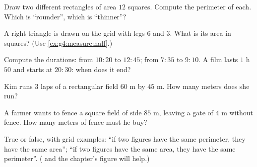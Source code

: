 \begin{exercise}[$\star$]\label{exo:g4:measure:6}
Draw two different rectangles of area $12$ squares. Compute the
perimeter of each. Which is ``rounder'', which is ``thinner''?
\end{exercise}

\begin{exercise}[$\star$]\label{exo:g4:measure:7}
A right triangle is drawn on the grid with legs $6$ and $3$. What is
its area in squares? (Use \cref{ex:g4:measure:half}.)
\end{exercise}

\begin{exercise}[$\star$]\label{exo:g4:measure:8}
Compute the durations: from $10{:}20$ to $12{:}45$; from $7{:}35$ to
$9{:}10$. A film lasts $1$ h $50$ and starts at $20{:}30$: when does
it end?
\end{exercise}

\begin{exercise}[$\star$]\label{exo:g4:measure:9}
Kim runs $3$ laps of a rectangular field $60$ m by $45$ m. How many
meters does she run?
\end{exercise}

\begin{exercise}[$\star\star$]\label{exo:g4:measure:10}
A farmer wants to fence a square field of side $85$ m, leaving a
gate of $4$ m without fence. How many meters of fence must he buy?
\end{exercise}

\begin{exercise}[$\star\star$]\label{exo:g4:measure:11}
True or false, with grid examples: ``if two figures have the same
perimeter, they have the same area''; ``if two figures have the same
area, they have the same perimeter''.
( and the chapter's figure will help.)
\end{exercise}
